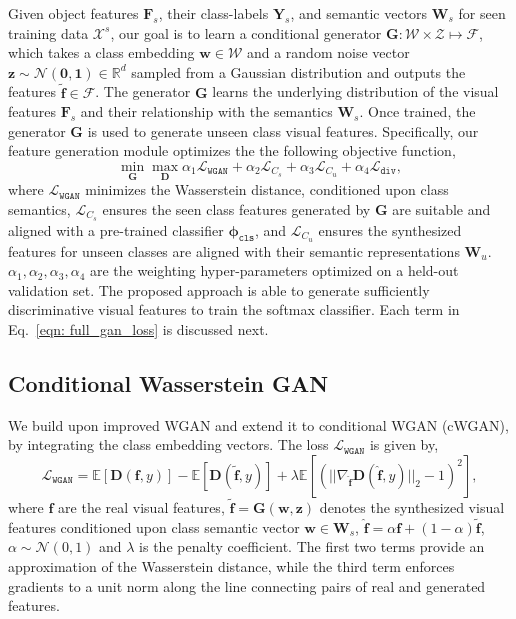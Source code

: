 \documentclass[runningheads]{llncs}
\begin{document}
Given object features $\mathbf{F}_s$, their class-labels $\mathbf{Y}_s$, and semantic vectors $\mathbf{W}_s$ for seen training data $ \mathcal{X}^{s}$, our goal is to learn a conditional generator $\mathbf{G}: \mathcal{W} \times \mathcal{Z} \mapsto\! \mathcal{F}$, which takes a class embedding $\mathbf{w} \in \mathcal{W}$ and a random noise vector $\mathbf{z} \sim \mathcal{N} (\mathbf{0},\mathbf{1}) \in  \mathbb{R}^d$ sampled from a Gaussian distribution and outputs the features $\mathbf{\tilde{f}} \in \mathcal{F}$. The generator $\mathbf{G}$ learns the underlying distribution of the visual features $\mathbf{F}_s$ and their relationship with the semantics $\mathbf{W}_s$. Once trained, the generator $\mathbf{G}$ is used to generate unseen class visual features. Specifically, our feature generation module optimizes the the following objective function,
\begin{equation}
    \min_{\mathbf{G}} \max_{\mathbf{D}} \alpha_{1} \mathcal{L}_{\texttt{WGAN}} +\alpha_{2} \mathcal{L}_{C_s} +\alpha_{3} \mathcal{L}_{C_u} + \alpha_4 \mathcal{L}_{\texttt{div}},
    \label{eqn: full_gan_loss}
\end{equation}
\noindent where $\mathcal{L}_{\texttt{WGAN}}$ minimizes the Wasserstein distance, conditioned upon class semantics,  $\mathcal{L}_{C_s}$ ensures the seen class features generated by $\mathbf{G}$ are suitable and aligned with a pre-trained classifier $\mathbf{\phi}_{\texttt{cls}}$, and $\mathcal{L}_{C_u}$ ensures the synthesized features for unseen classes are aligned with their semantic representations $\mathbf{W}_u$. $\alpha_{1},\alpha_{2},\alpha_{3},\alpha_{4}$ are the weighting hyper-parameters optimized on a held-out validation set.  The proposed approach is able to generate sufficiently discriminative visual features to train the softmax classifier. Each term in Eq.~\ref{eqn: full_gan_loss} is discussed next.

\subsection{Conditional Wasserstein GAN}
We build upon improved WGAN \cite{gulrajani2017improved} and extend it to conditional WGAN (cWGAN), by integrating the class embedding vectors. The loss $\mathcal{L}_{\texttt{WGAN}}$ is given by,
\begin{equation}
    \mathcal{L}_{\texttt{WGAN}} = \mathbb{E}[\mathbf{D}(\mathbf{f},y)] - \mathbb{E}[\mathbf{D}(\tilde{\mathbf{f}},y)] + \lambda \mathbb{E}[( || \nabla_{\hat{\mathbf{f}}} \mathbf{D} (\hat{\mathbf{f}},y) ||_2 -1 ) ^2],
\end{equation}
\noindent where $\mathbf{f}$ are the real visual features, $\tilde{\mathbf{f}} = \mathbf{G}(\mathbf{w},\mathbf{z})$ denotes the synthesized visual features conditioned upon class semantic vector $\mathbf{w} \in \mathbf{W}_s$, $\hat{\mathbf{f}}= \alpha \mathbf{f} + (1-\alpha) \tilde{\mathbf{f}}$, $\alpha \sim \mathcal{N}(0,1)$ and $\lambda$ is the penalty coefficient. The first two terms provide an approximation of the Wasserstein distance, while the third term enforces gradients to a unit norm along the line connecting pairs of real and generated features. 
\end{document}
